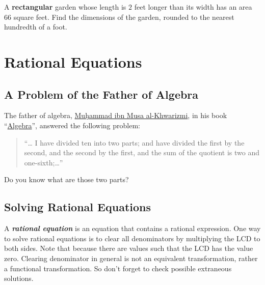 \documentclass[en,11pt]{elegantbook}
\newcommand{\size}[2]{{\fontsize{#1}{0}\selectfont#2}}
\newenvironment{rmdthink}{
	\vspace*{0.5\baselineskip}
	\par\noindent
	\makebox[-4pt][r]{\color{green!90}\size{12}{\faLightbulbO}\,\,}
    \begin{tcolorbox}[
    enhanced,
    title={\textbf{\color{second}Think}},
    title style={left color=blue!10!green!20!white,right color=yellow!20!blue!20!white},
    colback=green!20!white,
    ]
    \sffamily
}{
    \end{tcolorbox}
	\par\ignorespacesafterend
}
\let\BeginKnitrBlock\begin \let\EndKnitrBlock\end
\begin{document}
\BeginKnitrBlock{exercise}
\protect\hypertarget{exr:unnamed-chunk-141}{}{\label{exr:unnamed-chunk-141} }
A \textbf{rectangular} garden whose length is \(2\) feet longer than its width has an area 66 square feet. Find the dimensions of the garden, rounded to the nearest hundredth of a foot.
\EndKnitrBlock{exercise}

\hypertarget{rational-equations}{%
\chapter{Rational Equations}\label{rational-equations}}

\hypertarget{a-problem-of-the-father-of-algebra}{%
\section{A Problem of the Father of Algebra}\label{a-problem-of-the-father-of-algebra}}

\begin{rmdthink}

The father of algebra, \href{https://en.wikipedia.org/wiki/Muhammad_ibn_Musa_al-Khwarizmi\#Algebra}{Muḥammad ibn Musa al-Khwarizmi}, in his book ``\href{https://archive.org/details/algebraofmohamme00khuwrich/page/44/mode/2up}{Algebra}'', answered the following problem:

\begin{quote}
``\ldots{} I have divided ten into two parts; and have divided the first by the second, and the second by the first, and the sum of the quotient is two and one-sixth;\ldots{}''
\end{quote}

Do you know what are those two parts?

\end{rmdthink}

\hypertarget{solving-rational-equations}{%
\section{Solving Rational Equations}\label{solving-rational-equations}}

A \textbf{\emph{rational equation}} is an equation that contains a rational expression. One way to solve rational equations is to clear all denominators by multiplying the LCD to both sides. Note that because there are values such that the LCD has the value zero. Clearing denominator in general is not an equivalent transformation, rather a functional transformation. So don't forget to check possible extraneous solutions.
\end{document}
